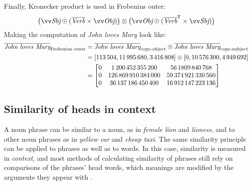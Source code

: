 Finally, Kronecker product is used in Frobenius outer:%
\begin{equation}
  \big(\ov{\text{\it Sbj}} \odot (\overline{\text{\it Verb}} \times \ov{\text{\it Obj}})\big) \otimes %
  \big(\ov{\text{\it Obj}} \odot (\overline{\text{\it Verb}}^{\mathsf{T}} \times \ov{\text{\it Sbj}})\big)
\end{equation}
%
Making the computation of \textit{John loves Mary} look like:
\begin{align*}
  \overline{\text{\it John loves Mary}}_{\text{Frobenius outer}} &=  \overline{\text{\it John loves Mary}}_{\text{copy-object}} \otimes \overline{\text{\it John loves Mary}}_{\text{copy-subject}}\\
                                                         &= [113\,504, 11\,995\,680,  3\,416\,808] \otimes [0, 10\,576\,300,  4\,949\,692] \\
                                                           &=%
                                                             \begin{bmatrix}
0 &   1\,200\,452\,355\,200 &      56\,1809\,840\,768 \\
0 & 126\,869\,910\,384\,000 &  59\,374\,921\,330\,560 \\
0 &  36\,137\,186\,450\,400 &  16\,912\,147\,223\,136 \\
                                                             \end{bmatrix}
\end{align*}


\subsection{Similarity of heads in context}
\label{sec:similarity-context}

A noun phrase can be similar to a noun, as in \textit{female lion} and \textit{lioness}, and to other noun phrases as in \textit{yellow car} and \textit{cheap taxi}. The same similarity principle can be applied to phrases as well as to words. In this case, similarity is measured in \emph{context},\footnotemark{} and most methods of calculating similarity of phrases still rely on comparisons of the phrases' head words, which meanings are modified by the arguments they appear with \cite{Kintsch2001173}.


